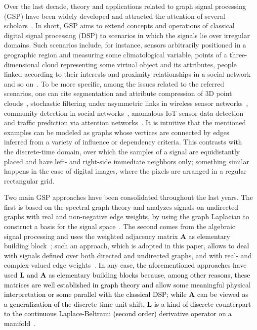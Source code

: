 Over the last decade, theory and applications related to graph signal processing (GSP) have been widely developed and attracted the attention of several scholars~\cite{ortega2018,richard2018,ribeiro2018}. In short, GSP aims to extend concepts and operations of classical digital signal processing (DSP) to scenarios in which the signals lie over irregular domains. Such scenarios include, for instance, sensors arbitrarily positioned in a geographic region and measuring some climatological variable, points of a three-dimensional cloud representing some virtual object and its attributes, people linked according to their interests and proximity relationships in a social network and so on~\cite{chen2014,zhang2014,benzi2016,weiyu2018,saad2018,jiang2021,gama2019,liu2019,zhang2020,ferreira2020,zhang2021,xiao2021,sun2021}. To be more specific, among the issues related to the referred scenarios, one can cite segmentation and attribute compression of 3D point clouds~\cite{zhang2014,zhang2020}, stochastic filtering under asymmetric links in wireless sensor networks~\cite{saad2018}, community detection in social networks~\cite{zhang2021}, anomalous IoT sensor data detection~\cite{xiao2021} and traffic prediction via attention networks~\cite{sun2021}. It is intuitive that the mentioned examples can be modeled as graphs whose vertices are connected by edges inferred from a variety of influence or dependency criteria. This contrasts with the discrete-time domain, over which the samples of a signal are equidistantly placed and have left- and right-side immediate neighbors only; something similar happens in the case of digital images, where the pixels are arranged in a regular rectangular grid.

Two main GSP approaches have been consolidated throughout the last years. The first is based on the spectral graph theory and analyzes signals on undirected graphs with real and non-negative edge weights, by using the graph Laplacian to construct a basis for the signal space~\cite{shuman2013emerging}. The second comes from the algebraic signal processing and uses the weighted adjacency matrix $\mathbf{A}$ as elementary building block~\cite{puschel2008time,puschel2008space}; such an approach, which is adopted in this paper, allows to deal with signals defined over both directed and undirected graphs, and with real- and complex-valued edge weights~\cite{sandryhaila2014big}. \textcolor{black}{In any case, the aforementioned approaches have used $\mathbf{L}$ and $\mathbf{A}$ as elementary building blocks because, among other reasons, these matrices are well established in graph theory and allow some meaningful physical interpretation or some parallel with the classical DSP; while $\mathbf{A}$ can be viewed as a generalization of the discrete-time unit shift, $\mathbf{L}$ is a kind of discrete counterpart to the continuous Laplace-Beltrami (second order) derivative operator on a manifold~\cite{chung1997spectral,Coifman2005}.}

